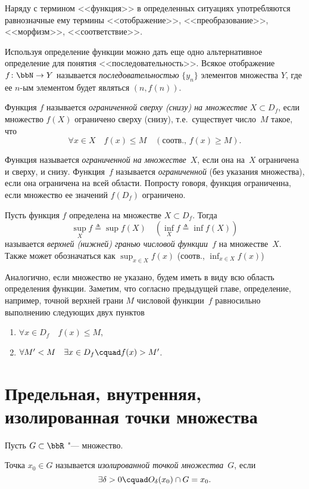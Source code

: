 Наряду с термином <<функция>> в определенных ситуациях употребляются равнозначные ему термины <<отображение>>, <<преобразование>>, <<морфизм>>, <<соответствие>>.
\begin{notion}
Используя определение функции можно дать еще одно альтернативное определение для понятия <<последовательность>>. Всякое отображение $f\colon \bbN \to Y$  называется \textit{последовательностью} $\{y_n\}$ элементов множества $Y$, где ее $n$-ым элементом будет являться $(n, f(n))$.
\end{notion} 

\begin{defn}
Функция $f$ называется \textit{ограниченной сверху (снизу) на множестве} $X\subset D_f$, если множество $f(X)$ ограничено сверху (снизу), т.е.~существует число~$M$ такое, что
$$
\forall x \in X \quad f(x) \le M \quad (\text{соотв., }f(x)\ge M).
$$
\end{defn}

Функция называется \textit{ограниченной на множестве}~$X$, если она на~$X$ ограничена и сверху, и снизу. Функция~$f$ называется \textit{ограниченной} (без указания множества), если она ограничена на всей области. Попросту говоря, функция ограниченна, если множество ее значений $f(D_f)$ ограничено.

\begin{defn}
Пусть функция $f$ определена на множестве $X\subset D_f$. Тогда 
$$
\sup_{X}\limits f \triangleq \sup f(X)\quad (\inf_{X}\limits f \triangleq \inf f(X))
$$ называется \textit{верхней (нижней) гранью числовой функции~$f$} на множестве~$X$. Также может обозначаться как $\sup_{x\in X}\limits f(x)$ (соотв., $\inf_{x\in X}\limits f(x)$)
\end{defn}

Аналогично, если множество не указано, будем иметь в виду всю область определения функции. Заметим, что согласно предыдущей главе, определение, например, точной верхней грани $M$ числовой функции~$f$ равносильно выполнению следующих двух пунктов 
\begin{enumerate}
\item
$\forall x \in D_f\quad f(x) \le M$,
\item
$\forall M' < M \quad \exists x\in D_f\cquad f(x) > M'$.
\end{enumerate}

\section{Предельная, внутренняя, изолированная точки множества}
Пусть $G \subset \bbR$ "--- множество.
\begin{defn}
Точка $x_0 \in G$ называется \textit{изолированной точкой множества}~$G$, если $$\exists \delta >0\cquad  O_\delta(x_0) \cap G = x_0.$$
\end{defn}

